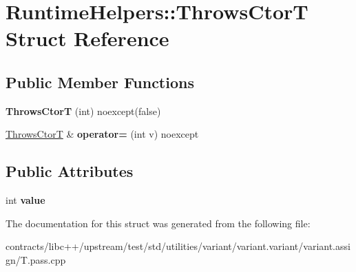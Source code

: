 \hypertarget{struct_runtime_helpers_1_1_throws_ctor_t}{}\section{Runtime\+Helpers\+:\+:Throws\+CtorT Struct Reference}
\label{struct_runtime_helpers_1_1_throws_ctor_t}
\subsection*{Public Member Functions}
\begin{DoxyCompactItemize}
\item 
\mbox{\label{struct_runtime_helpers_1_1_throws_ctor_t_a576532233d4ecf4828c786c9c6da3367}} 
{\bfseries Throws\+CtorT} (int) noexcept(false)
\item 
\mbox{\label{struct_runtime_helpers_1_1_throws_ctor_t_aa4c9be093d64855f531527730794621d}} 
\mbox{\hyperlink{struct_runtime_helpers_1_1_throws_ctor_t}{Throws\+CtorT}} \& {\bfseries operator=} (int v) noexcept
\end{DoxyCompactItemize}
\subsection*{Public Attributes}
\begin{DoxyCompactItemize}
\item 
\mbox{\label{struct_runtime_helpers_1_1_throws_ctor_t_a323a80b15a9f0a8ece1385e81b010676}} 
int {\bfseries value}
\end{DoxyCompactItemize}


The documentation for this struct was generated from the following file\+:\begin{DoxyCompactItemize}
\item 
contracts/libc++/upstream/test/std/utilities/variant/variant.\+variant/variant.\+assign/T.\+pass.\+cpp\end{DoxyCompactItemize}
